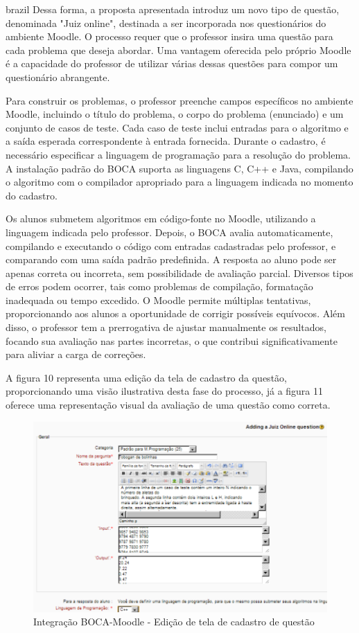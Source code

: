 \begin{otherlanguage*}{brazil}
Dessa forma, a proposta apresentada introduz um novo tipo de questão, denominada "Juiz online", destinada a ser incorporada nos questionários do ambiente Moodle. O processo requer que o professor insira uma questão para cada problema que deseja abordar. Uma vantagem oferecida pelo próprio Moodle é a capacidade do professor de utilizar várias dessas questões para compor um questionário abrangente.
	
Para construir os problemas, o professor preenche campos específicos no ambiente Moodle, incluindo o título do problema, o corpo do problema (enunciado) e um conjunto de casos de teste. Cada caso de teste inclui entradas para o algoritmo e a saída esperada correspondente à entrada fornecida. Durante o cadastro, é necessário especificar a linguagem de programação para a resolução do problema. A instalação padrão do BOCA suporta as linguagens C, C++ e Java, compilando o algoritmo com o compilador apropriado para a linguagem indicada no momento do cadastro.

Os alunos submetem algoritmos em código-fonte no Moodle, utilizando a linguagem indicada pelo professor. Depois, o BOCA avalia automaticamente, compilando e executando o código com entradas cadastradas pelo professor, e comparando com uma saída padrão predefinida. A resposta ao aluno pode ser apenas correta ou incorreta, sem possibilidade de avaliação parcial. Diversos tipos de erros podem ocorrer, tais como problemas de compilação, formatação inadequada ou tempo excedido. O Moodle permite múltiplas tentativas, proporcionando aos alunos a oportunidade de corrigir possíveis equívocos. Além disso, o professor tem a prerrogativa de ajustar manualmente os resultados, focando sua avaliação nas partes incorretas, o que contribui significativamente para aliviar a carga de correções.
 
A figura 10 representa uma edição da tela de cadastro da questão, proporcionando uma visão ilustrativa desta fase do processo, já a figura 11 oferece uma representação visual da avaliação de uma questão como correta.

\begin{figure}[h!]
	   \centering
            \caption{Integração BOCA-Moodle - Edição de tela de cadastro de questão}
            \label{fig:ModeloConceitual}
	   	\includegraphics[scale=0.3]{pictures/BOCA_edicao.png}
\end{figure}


\end{otherlanguage*}
